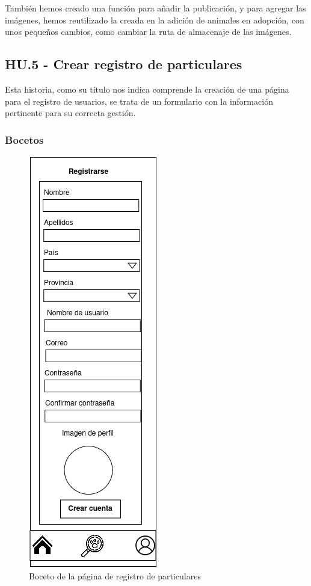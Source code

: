 También hemos creado una función para añadir la publicación, y para agregar las imágenes, hemos reutilizado la creada en la adición de animales en adopción, con unos pequeños cambios, como cambiar la ruta de almacenaje de las imágenes. \\ 




\subsection{HU.5 - Crear registro de particulares}

Esta historia, como su título nos indica comprende la creación de una página para el registro de usuarios, se trata de un formulario con la información pertinente para su correcta gestión.\\

\subsubsection{Bocetos}
\begin{figure}[H]
	\centering
	\includegraphics[width=0.31\linewidth]{"sprint 2/hu5/registro_particulares"}
	\caption{Boceto de la página de registro de particulares}
	\label{fig:registroparticulares}
\end{figure}

